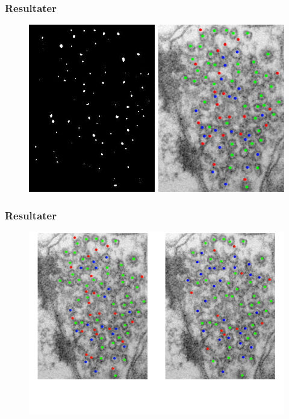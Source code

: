 \documentclass[12pt,t]{beamer}
\begin{document}
\begin{frame}
\frametitle{Resultater}
\begin{figure}[H]
	\centering
	\includegraphics[scale=0.4]{img/finalmethod/thres_plot.png}
\end{figure}
\end{frame}


\begin{frame}
\frametitle{Resultater}
\begin{figure}[H]
	\centering
	\includegraphics[scale=0.4]{img/afstand/res_1.png}
\end{figure}
\end{frame}
\end{document}
